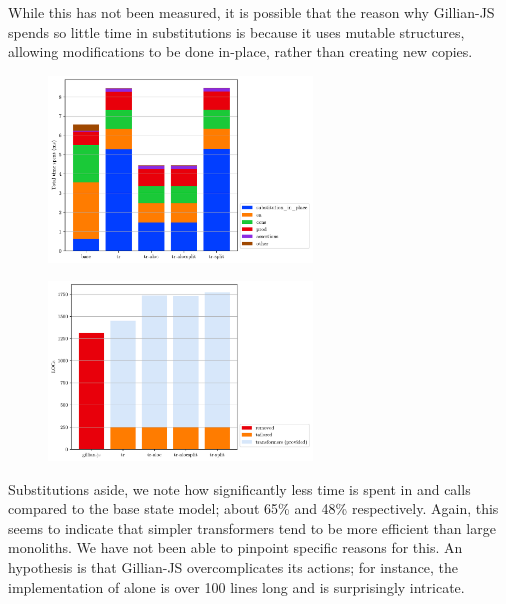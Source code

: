While this has not been measured, it is possible that the reason why Gillian-JS spends so little time in substitutions is because it uses mutable structures, allowing modifications to be done in-place, rather than creating new copies.

\begin{figure}
\captionsetup{width=.4\linewidth}
\centering
\begin{minipage}[t]{.45\textwidth}
	\centering
	\includegraphics[width=7cm]{figures/js/verif_time_spent_per_action.pdf}
	\label{fig:js-timespent-verif}
\end{minipage}\hfill%
\begin{minipage}[t]{.45\textwidth}
	\centering
	\includegraphics[width=7cm]{figures/js/locs.pdf}
	\label{fig:js-loc-count}
\end{minipage}%
\end{figure}

Substitutions aside, we note how significantly less time is spent in \execac{} and \consume{} calls compared to the base state model; about 65\% and 48\% respectively. Again, this seems to indicate that simpler transformers tend to be more efficient than large monoliths. We have not been able to pinpoint specific reasons for this. An hypothesis is that Gillian-JS overcomplicates its actions; for instance, the implementation of  alone is over 100 lines long and is surprisingly intricate.

